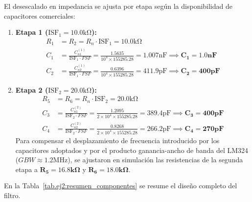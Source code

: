 El desescalado en impedancia se ajusta por etapa según la disponibilidad de capacitores comerciales:
\begin{enumerate}
    \item \textbf{Etapa 1 ($\text{ISF}_1 = 10.0 \unit{\kilo\ohm}$):}
        \begin{align*}
            R_1 &= R_2 = R_n \cdot \text{ISF}_1 = 10.0 \unit{\kilo\ohm} \\
            C_1 &= \frac{C_{n1}^{(1)}}{\text{ISF}_1 \cdot FSF} = \frac{1.5635}{10^4 \times 155285.28} = 1.007 \unit{\nano\farad} \implies \mathbf{C_1 = 1.0 \unit{\nano\farad}} \\
            C_2 &= \frac{C_{n2}^{(1)}}{\text{ISF}_1 \cdot FSF} = \frac{0.6396}{10^4 \times 155285.28} = 411.9 \unit{\pico\farad} \implies \mathbf{C_2 = 400 \unit{\pico\farad}}
        \end{align*}

    \item \textbf{Etapa 2 ($\text{ISF}_2 = 20.0 \unit{\kilo\ohm}$):}
        \begin{align*}
            R_5 &= R_6 = R_n \cdot \text{ISF}_2 = 20.0 \unit{\kilo\ohm} \\
            C_3 &= \frac{C_{n1}^{(2)}}{\text{ISF}_2 \cdot FSF} = \frac{1.2095}{2\times 10^4 \times 155285.28} = 389.4 \unit{\pico\farad} \implies \mathbf{C_3 = 400 \unit{\pico\farad}} \\
            C_4 &= \frac{C_{n2}^{(2)}}{\text{ISF}_2 \cdot FSF} = \frac{0.8268}{2\times 10^4 \times 155285.28} = 266.2 \unit{\pico\farad} \implies \mathbf{C_4 = 270 \unit{\pico\farad}}
        \end{align*}
        Para compensar el desplazamiento de frecuencia introducido por los capacitores adoptados y por el producto
        ganancia-ancho de banda del LM324 ($GBW \approx 1.2 \unit{\mega\hertz}$), se ajustaron en simulación las
        resistencias de la segunda etapa a $\mathbf{R_5 = 16.8 \unit{\kilo\ohm}}$ y $\mathbf{R_6 = 18.0 \unit{\kilo\ohm}}$.
\end{enumerate}

En la Tabla~\ref{tab.ej2:resumen_componentes} se resume el diseño completo del filtro.

